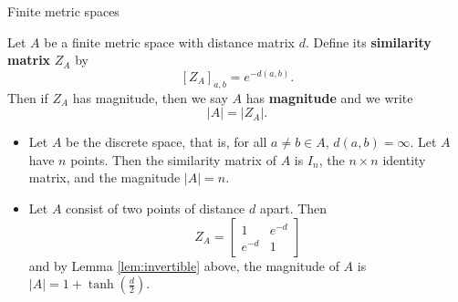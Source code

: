 \documentclass[12pt,mathserif]{beamer}
\begin{document}
\begin{frame}[allowframebreaks]{Finite metric spaces}

\begin{definition}
Let $A$ be a finite metric space with distance matrix $d$. Define its \textbf{similarity matrix} $Z_A$ by
\begin{equation*}
\left[Z_A\right]_{a,b} = e^{-d(a,b)}.
\end{equation*}
Then if $Z_A$ has magnitude, then we say $A$ has \textbf{magnitude} and we write
\begin{equation*}
\vert A \vert = \vert Z_A \vert.
\end{equation*}
\end{definition}

\framebreak

\begin{example}
\begin{itemize}
\item Let $A$ be the discrete space, that is, for all $a\neq b \in A$, $d(a,b) = \infty$. Let $A$ have $n$ points. Then the similarity matrix of $A$ is $I_n$, the $n\times n$ identity matrix, and the magnitude $\vert A \vert = n$.
\item Let $A$ consist of two points of distance $d$ apart. Then
\begin{equation*}
Z_A = \begin{bmatrix} 1 & e^{-d} \\ e^{-d} & 1 \end{bmatrix}
\end{equation*}
and by Lemma \ref{lem:invertible} above, the magnitude of $A$ is $\vert A \vert = 1 + \tanh\left(\frac{d}{2}\right)$.
\end{itemize}
\end{example}

\end{frame}
\end{document}
